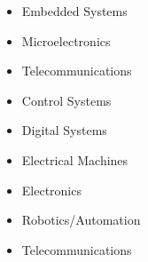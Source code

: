 \documentclass[12pt, a4paper]{cv}
\begin{document}
\begin{minipage}{0.5\linewidth}
\begin{itemize}
\item Embedded Systems
\item Microelectronics
\item Telecommunications\newline
\end{itemize}
\end{minipage}\hfil
\begin{minipage}{0.5\linewidth}
\end{minipage}

\begin{minipage}{0.8\linewidth}
	 \newline
\end{minipage}\hfil
\begin{minipage}{0.2\linewidth}
	\begin{flushright}
	\end{flushright}
\end{minipage}

\begin{minipage}{0.5\linewidth}
\begin{itemize}
\item Control Systems
\item Digital Systems
\item Electrical Machines
\end{itemize}
\end{minipage}\hfil
\begin{minipage}{0.5\linewidth}
\begin{itemize}
\item Electronics
\item Robotics/Automation
\item Telecommunications
\end{itemize}
\end{minipage}

\vspace{4mm}

\begin{minipage}{0.25\linewidth}
	\begin{center}
	\end{center}
\end{minipage}\hfil
\begin{minipage}{0.25\linewidth}
	\begin{center}
	\end{center}
\end{minipage}
\end{document}
